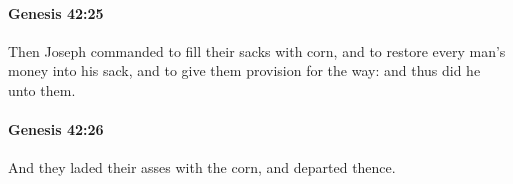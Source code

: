 		\paragraph{Genesis 42:25} %
			\label{GENESIS-42-25}

			Then Joseph commanded to fill their sacks with corn, and to restore every man's money into his sack, and to give them provision for the way: and thus did he unto them.


		\paragraph{Genesis 42:26} %
			\label{GENESIS-42-26}

			And they laded their asses with the corn, and departed thence.


